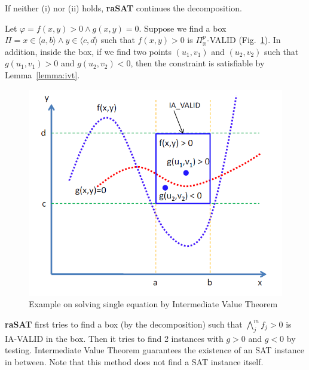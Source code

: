 \documentclass[runningheads,a4paper,oribibl]{llncs}
\newcommand{\suppress}[1]{} %
\begin{document}
\suppress{
\begin{proof}
\begin{enumerate}[(i)]
\item If $l_g > 0$ or $h_g < 0$, then $g=0$ cannot be satisfied in box $I$.
  As a result, $F$ is UNSAT in $I$. 
\item If there are two instances $\vec{t},\vec{t'}$ in the box with
  $g(\vec{t}) > 0$ and $g(\vec{t'}) < 0$, it is clear from the Intermediate
  Value Theorem that there exist one point $\vec{t_0}$ between $\vec{t}$ and
  $\vec{t'}$ such that $g(\vec{t_0}) = 0$. In addition, because
  $\bigwedge \limits_{j}^m f_j > 0$ is IA-VALID in $I$, $\vec{t_0}$ also
  satisfies $\bigwedge \limits_{j}^m f_j > 0$.
  As a result, $F$ is satisfiable with $\vec{t_0}$ as the SAT instance.
\end{enumerate}
\end{proof}
}
If neither (i) nor (ii) holds, \textbf{raSAT} continues the decomposition.
\begin{example}
  Let $\varphi = f(x, y) > 0 \wedge g(x, y) = 0$.
  Suppose we find a box 
  $\Pi = x \in \langle a, b \rangle \wedge y \in \langle c, d \rangle$
  such that $f(x, y) > 0$ is $\Pi^p_\mathbb{R}$-VALID
  (Fig.~\ref{fig:single-equation}).
  In addition, inside the box,
  if we find two points $(u_1, v_1)$ and $(u_2, v_2)$ such that
  $g(u_1, v_1) > 0$ and $g(u_2, v_2) < 0$,
  then the constraint is satisfiable by Lemma~\ref{lemma:ivt}. 
\end{example}
\begin{figure}[ht]
\centering
\includegraphics[scale=0.3]{singleEquation.png} 
\caption{Example on solving single equation by Intermediate Value Theorem} 
\label{fig:single-equation} 
\end{figure}
    {\bf raSAT} first tries to find a box (by the decomposition) such that
    $\bigwedge \limits_{j}^m f_j > 0$ is IA-VALID in the box.
    Then it tries to find 2 instances with $g > 0$ and $g < 0$ by testing. 
    Intermediate Value Theorem guarantees the existence of an SAT instance
    in between. Note that this method does not find a SAT instance itself. 
\end{document}
